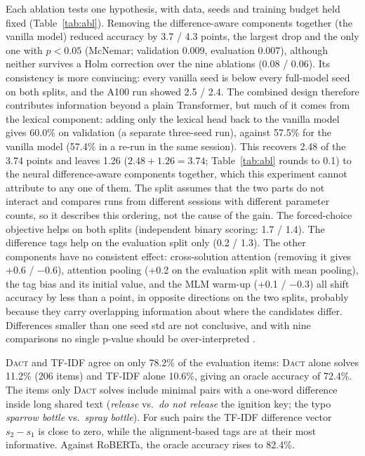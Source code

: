 \documentclass[11pt]{article}
\newcommand{\dact}{\textsc{Dact}}
\begin{document}
Each ablation tests one hypothesis, with data, seeds and training budget held fixed (Table~\ref{tab:abl}). Removing the difference-aware components together (the vanilla model) reduced accuracy by 3.7 / 4.3 points, the largest drop and the only one with $p{<}0.05$ (McNemar; validation 0.009, evaluation 0.007), although neither survives a Holm correction over the nine ablations (0.08 / 0.06). Its consistency is more convincing: every vanilla seed is below every full-model seed on both splits, and the A100 run showed 2.5 / 2.4. The combined design therefore contributes information beyond a plain Transformer, but much of it comes from the lexical component: adding only the lexical head back to the vanilla model gives 60.0\% on validation (a separate three-seed run), against 57.5\% for the vanilla model (57.4\% in a re-run in the same session). This recovers 2.48 of the 3.74 points and leaves 1.26 ($2.48 + 1.26 = 3.74$; Table~\ref{tab:abl} rounds to 0.1) to the neural difference-aware components together, which this experiment cannot attribute to any one of them. The split assumes that the two parts do not interact and compares runs from different sessions with different parameter counts, so it describes this ordering, not the cause of the gain. The forced-choice objective helps on both splits (independent binary scoring: 1.7 / 1.4). The difference tags help on the evaluation split only (0.2 / 1.3). The other components have no consistent effect: cross-solution attention (removing it gives +0.6 / $-$0.6), attention pooling (+0.2 on the evaluation split with mean pooling), the tag bias and its initial value, and the MLM warm-up (+0.1 / $-$0.3) all shift accuracy by less than a point, in opposite directions on the two splits, probably because they carry overlapping information about where the candidates differ. Differences smaller than one seed std are not conclusive, and with nine comparisons no single p-value should be over-interpreted \cite{dror2018hitchhiker}.

\dact{} and TF-IDF agree on only 78.2\% of the evaluation items: \dact{} alone solves 11.2\% (206 items) and TF-IDF alone 10.6\%, giving an oracle accuracy of 72.4\%. The items only \dact{} solves include minimal pairs with a one-word difference inside long shared text (\emph{release} vs.\ \emph{do not release} the ignition key; the typo \emph{sparrow bottle} vs.\ \emph{spray bottle}). For such pairs the TF-IDF difference vector $s_2 - s_1$ is close to zero, while the alignment-based tags are at their most informative. Against RoBERTa, the oracle accuracy rises to 82.4\%.
\end{document}
